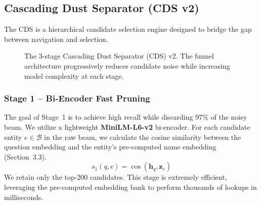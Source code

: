 \documentclass[11pt,a4paper]{article}
\newcommand{\CDS}{\textsc{CDS}}
\begin{document}
\subsection{Cascading Dust Separator (\CDS{} v2)}
\label{sec:cds}

The CDS is a hierarchical candidate selection engine designed to bridge the gap between navigation and selection.

\begin{figure}[h]
  \centering
  \caption{The 3-stage Cascading Dust Separator (CDS) v2. The funnel architecture progressively reduces candidate noise while increasing model complexity at each stage.}
  \label{fig:cds-funnel}
\end{figure}

\subsubsection{Stage 1 -- Bi-Encoder Fast Pruning}
The goal of Stage~1 is to achieve high recall while discarding 97\% of the
noisy beam. We utilize a lightweight \textbf{MiniLM-L6-v2} bi-encoder.
For each candidate entity $e \in \mathcal{B}$ in the raw beam, we calculate
the cosine similarity between the question embedding and the entity's
pre-computed name embedding (Section~3.3).
\[
    s_1(q, e) = \cos(\mathbf{h}_q, \mathbf{z}_e)
\]
We retain only the top-200 candidates. This stage is extremely efficient,
leveraging the pre-computed embedding bank to perform thousands of lookups
in milliseconds.
\end{document}
